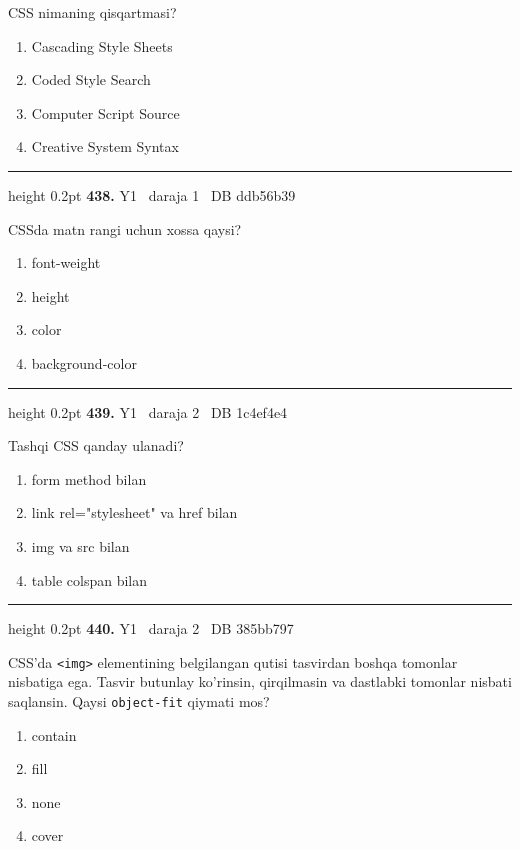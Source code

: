 \documentclass[10pt,a4paper,oneside]{article}
\begin{document}
CSS nimaning qisqartmasi?
\begin{enumerate}[label=\Alph*),leftmargin=9mm]
\item Cascading Style Sheets
\item Coded Style Search
\item Computer Script Source
\item Creative System Syntax
\end{enumerate}
\vspace{2mm}\hrule height 0.2pt \vspace{4mm}
\hypertarget{q438}{\textbf{\color{ink}438.}}  {\color{muted}\scriptsize Y1 \textbullet\ daraja 1 \textbullet\ DB ddb56b39}
\par
CSSda matn rangi uchun xossa qaysi?
\begin{enumerate}[label=\Alph*),leftmargin=9mm]
\item font-weight
\item height
\item color
\item background-color
\end{enumerate}
\vspace{2mm}\hrule height 0.2pt \vspace{4mm}
\hypertarget{q439}{\textbf{\color{ink}439.}}  {\color{muted}\scriptsize Y1 \textbullet\ daraja 2 \textbullet\ DB 1c4ef4e4}
\par
Tashqi CSS qanday ulanadi?
\begin{enumerate}[label=\Alph*),leftmargin=9mm]
\item form method bilan
\item link rel="stylesheet" va href bilan
\item img va src bilan
\item table colspan bilan
\end{enumerate}
\vspace{2mm}\hrule height 0.2pt \vspace{4mm}
\hypertarget{q440}{\textbf{\color{ink}440.}}  {\color{muted}\scriptsize Y1 \textbullet\ daraja 2 \textbullet\ DB 385bb797}
\par
CSS'da \texttt{\textless{}img\textgreater{}} elementining belgilangan qutisi tasvirdan boshqa tomonlar nisbatiga ega. Tasvir butunlay ko'rinsin, qirqilmasin va dastlabki tomonlar nisbati saqlansin. Qaysi \texttt{object-fit} qiymati mos?
\begin{enumerate}[label=\Alph*),leftmargin=9mm]
\item contain
\item fill
\item none
\item cover
\end{enumerate}
\end{document}
